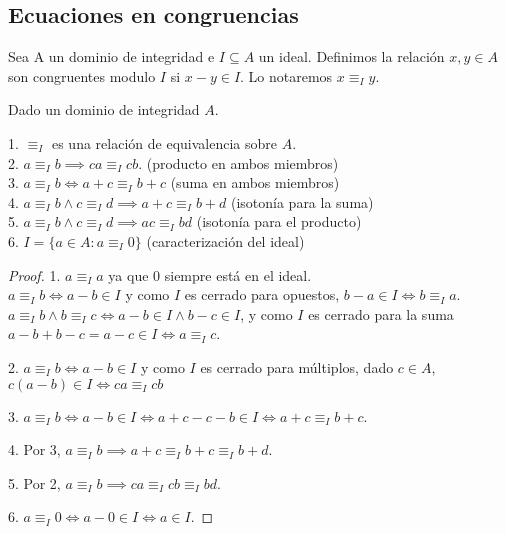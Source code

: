 \subsection{Ecuaciones en congruencias}

\begin{definition}
Sea A un dominio de integridad e $I \subseteq A$ un ideal. Definimos la relación $x,y \in A$ son congruentes modulo $I$ si $x-y \in I$. Lo notaremos $x \equiv_{I} y$.
\end{definition}

\begin{proposition}\label{prop-congruencias}
Dado un dominio de integridad $A$. 

1. $\equiv_{I}$ es una relación de equivalencia sobre $A$. \\
2. $a \equiv_{I} b \implies ca \equiv_{I} cb$. (producto en ambos miembros) \\
3. $a \equiv_{I} b \iff a+c \equiv_{I} b+c$ (suma en ambos miembros)\\
4. $a \equiv_{I} b \land c \equiv_{I} d \implies a+c \equiv_{I} b+d$ (isotonía para la suma)\\
5. $a \equiv_{I} b \land c \equiv_{I} d \implies ac \equiv_{I} bd$ (isotonía para el producto)\\
6. $I = \{a \in A:a \equiv_{I} 0\}$ (caracterización del ideal)\\
\end{proposition}
\begin{proof}
1. $a \equiv_{I} a$ ya que $0$ siempre está en el ideal.\\
$a \equiv_{I} b \iff a-b \in I$ y como $I$ es cerrado para opuestos, $b-a \in I \iff b \equiv_{I} a$. \\
$a \equiv_{I} b \land b \equiv_{I} c \iff a-b \in I \land b-c \in I$, y como $I$ es cerrado para la suma $a-b+b-c = a-c \in I \iff a \equiv_{I} c$. 

2. $a \equiv_{I} b \iff a-b \in I$ y como $I$ es cerrado para múltiplos, dado $c \in A$, $c(a-b) \in I \iff ca \equiv_{I} cb$

3. $a \equiv_{I} b \iff a-b \in I \iff a+c-c-b \in I \iff a+c \equiv_{I} b+c$.

4. Por 3, $a \equiv_{I} b \implies a+c \equiv_{I} b+c \equiv_{I} b+d$.  

5. Por 2, $a \equiv_{I} b \implies ca \equiv_{I} cb \equiv_{I} bd$. 

6. $a \equiv_{I} 0 \iff a-0 \in I \iff  a \in I$.
\end{proof}

